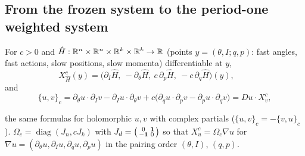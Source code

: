 \subsection{From the frozen system to the period-one weighted system}\label{bpN:p11:s-conv}

\begin{definition}\label{bpN:p11:wfield}
For $c>0$ and $\hat H:\mathbb{R}^n\times\mathbb{R}^n\times\mathbb{R}^k\times\mathbb{R}^k\to\mathbb{R}$ (points $y=(\theta,I;q,p)$: fast angles, fast actions, slow positions, slow momenta) differentiable at $y$,
\[X^{c}_{\hat H}(y)=\bigl(\partial_I\hat H,\ -\partial_\theta\hat H,\ c\,\partial_p\hat H,\ -c\,\partial_q\hat H\bigr)(y),\qquad\]
and
\[ \{u,v\}_c=\partial_\theta u\cdot\partial_Iv-\partial_Iu\cdot\partial_\theta v+c\bigl(\partial_qu\cdot\partial_pv-\partial_pu\cdot\partial_qv\bigr)=Du\cdot X^c_v,\]

the same formulas for holomorphic $u,v$ with complex partials ($\{u,v\}_c=-\{v,u\}_c$). $\Omega_c=\operatorname{diag}(J_n,cJ_k)$ with $J_d=\begin{psmallmatrix}0&\mathbf1\\-\mathbf1&0\end{psmallmatrix}$ so that $X_u^c=\Omega_c\nabla u$ for $\nabla u=(\partial_\theta u,\partial_Iu,\partial_qu,\partial_pu)$ in the pairing order $(\theta,I)$, $(q,p)$.
\end{definition}

